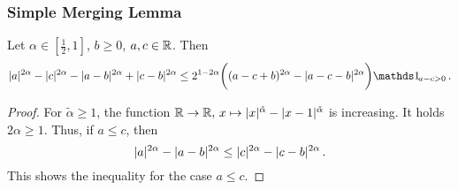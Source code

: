 \subsubsection{Simple Merging Lemma}
%
\begin{lemma}\label{lmm:merging:simple}
	Let $\alpha\in[\frac12,1]$, $b\geq0$, $a,c\in\mathbb{R}$.
	Then
	\begin{equation*}
		|a|^{2\alpha}-|c|^{2\alpha}-|a-b|^{2\alpha}+|c-b|^{2\alpha} \leq 
		2^{1-2\alpha} \bigg(
							(a-c + b)^{2\alpha}  -  |a-c - b|^{2\alpha}
						\bigg) \indOf{a-c>0}
		\eqfs
	\end{equation*}
\end{lemma}
%
\begin{proof}
	For $\tilde \alpha\geq 1$, the function $\mathbb{R}\to\mathbb{R},\, x\mapsto |x|^{\tilde\alpha}-|x-1|^{\tilde\alpha}$ is increasing.
	It holds $2\alpha\geq1$. Thus, if $a\leq c$, then
	\begin{equation*}
		|a|^{2\alpha}-|a-b|^{2\alpha}\leq |c|^{2\alpha}-|c-b|^{2\alpha} 
		\, .
	\end{equation*}
	This shows the inequality for the case $a\leq c$.
	

\end{proof}
